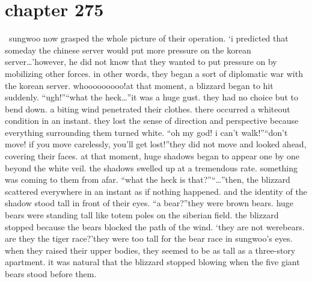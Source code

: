 \section{chapter 275}






 sungwoo now grasped the whole picture of their operation.
‘i predicted that someday the chinese server would put more pressure on the korean server…’however, he did not know that they wanted to put pressure on by mobilizing other forces.
 in other words, they began a sort of diplomatic war with the korean server.
whooooooooo!at that moment, a blizzard began to hit suddenly.
“ugh!”“what the heck…”it was a huge gust.
 they had no choice but to bend down.
 a biting wind penetrated their clothes.
 there occurred a whiteout condition in an instant.
 they lost the sense of direction and perspective because everything surrounding them turned white.
“oh my god! i can’t walk!”“don’t move! if you move carelessly, you’ll get lost!”they did not move and looked ahead, covering their faces.
at that moment, huge shadows began to appear one by one beyond the white veil.
 the shadows swelled up at a tremendous rate.
 something was coming to them from afar.
“what the heck is that?”“…”then, the blizzard scattered everywhere in an instant as if nothing happened.
 and the identity of the shadow stood tall in front of their eyes.
“a bear?”they were brown bears.
 huge bears were standing tall like totem poles on the siberian field.
 the blizzard stopped because the bears blocked the path of the wind.
‘they are not werebears.
 are they the tiger race?’they were too tall for the bear race in sungwoo’s eyes.
 when they raised their upper bodies, they seemed to be as tall as a three-story apartment.
 it was natural that the blizzard stopped blowing when the five giant bears stood before them.

